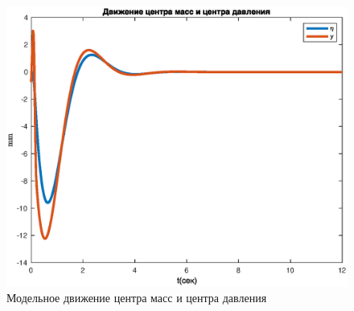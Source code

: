 \documentclass[a4paper,12pt, openany]{book}
\theoremstyle{plain} %
\theoremstyle{definition} %
\theoremstyle{remark} %
\numberwithin{equation}{chapter}
\begin{document}
{\begin{figure}[h!]
\begin{center}
\begin{minipage}[h]{0.48\linewidth}
            \includegraphics[width=1\linewidth]{eta_model.eps}
            \caption{Модельное движение центра масс и центра давления}
        \end{minipage}
    \end{center}
\end{figure}

}
\end{document}
